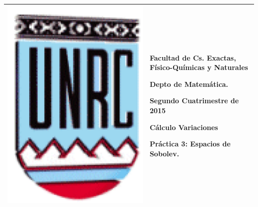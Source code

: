 \documentclass{article}
\begin{document}
\setlength{\unitlength}{1cm}
%
\setlength{\extrarowheight}{5mm}
%

\setlength{\extrarowheight}{-5mm}
\noindent\begin{tabular}{m{} m{}}\hline\hline
\medskip

\includegraphics[scale=0.3]{imagenes/unrc.jpg} &
\begin{bfseries}  \begin{scshape}
Facultad de Cs. Exactas, Físico-Químicas y Naturales\par
        Depto de Matem\'atica.\par
        Segundo Cuatrimestre de 2015\par
        Cálculo Variaciones \par

        Práctica 3: Espacios de Sobolev.
				\end{scshape}
\end{bfseries}
\\
\hline\hline
\end{tabular}
\renewcommand{\theenumi}{\alph{enumi}}
\end{document}

